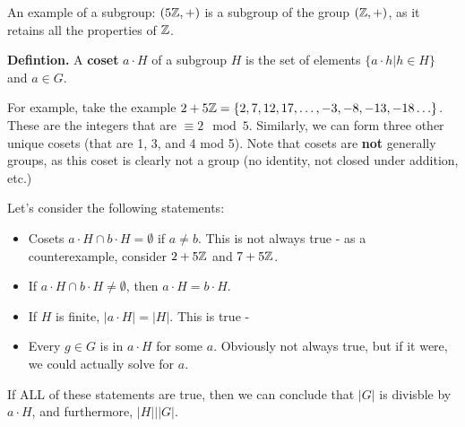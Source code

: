 An example of a subgroup: $(5\mathbb{Z}, +)$ is a subgroup of the group $(\mathbb{Z}, +)$, as it retains all the properties of $\mathbb{Z}$. 

\textbf{Defintion. } A \textbf{coset} $a\cdot H$ of a subgroup $H$ is the set of elements $\{ a \cdot h | h \in H\}$ and $a \in G$. 

For example, take the example $2 + 5\mathbb{Z} = \{2, 7, 12, 17, \ldots, -3, -8, -13 ,-18 \ldots \}$. These are the integers that are $\equiv 2 \mod 5$. Similarly, we can form three other unique cosets (that are 1, 3, and 4 mod 5). Note that cosets are \textbf{not} generally groups, as this coset is clearly not a group (no identity, not closed under addition, etc.) 

Let's consider the following statements: 
\begin{itemize}
\item Cosets $a \cdot H \cap b \cdot H = \emptyset$ if $a \neq b$. This is not always true - as a counterexample, consider $2 + 5 \mathbb{Z}$ and $ 7 + 5 \mathbb{Z}$. 
\item If $a \cdot H \cap b \cdot H \neq \emptyset$, then $a\cdot H = b \cdot H$. 
\item If $H$ is finite, $|a\cdot H| = |H|$. This is true - 
\item Every $g \in G$ is in $a \cdot H$ for some $a$. Obviously not always true, but if it were, we could actually solve for $a$. 
\end{itemize}
If ALL of these statements are true, then we can conclude that $|G|$ is divisble by $a\cdot H$, and furthermore, $|H| | |G|$. 

% 
